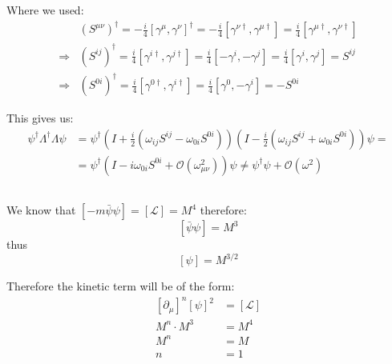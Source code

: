 \documentclass[11pt]{article}
\begin{document}
Where we used:
\begin{equation}
\begin{split}
    &(S^{\mu\nu})^\dagger = 
    -\frac{i}{4}[\gamma^\mu,\gamma^\nu]^\dagger=
    -\frac{i}{4}[\gamma^{\nu\dagger},\gamma^{\mu\dagger}]=
    \frac{i}{4}[\gamma^{\mu\dagger},\gamma^{\nu\dagger}]\\
    \Rightarrow & (S^{ij})^\dagger = 
    \frac{i}{4}[\gamma^{i\dagger},\gamma^{j\dagger}]=
    \frac{i}{4}[-\gamma^i,-\gamma^j]=
    \frac{i}{4}[\gamma^i,\gamma^j] = 
    S^{ij}\\
    \Rightarrow & (S^{0i})^\dagger = 
    \frac{i}{4}[\gamma^{0\dagger},\gamma^{i\dagger}]=
    \frac{i}{4}[\gamma^0,-\gamma^i]=
    -S^{0i}
\end{split}
\end{equation}

This gives us:
\begin{equation}
\begin{split}
    \psi^\dagger\Lambda^\dagger\Lambda\psi &= 
    \psi^\dagger \left( I + \frac{i}{2}(\omega_{ij}S^{ij}-\omega_{0i}S^{0i}) \right) \left(I - \frac{i}{2}(\omega_{ij}S^{ij} + \omega_{0i}S^{0i}) \right) \psi=\\
    &=\psi^\dagger\left(I - i\omega_{0i}S^{0i} +\mathcal O(\omega_{\mu \nu}^2) \right)\psi  \neq \psi^\dagger\psi + \mathcal O(\omega^2)
\end{split}
\end{equation}

\subsection{}
We know that $[-m\bar\psi \psi]=[\mathcal L]=M^4$ therefore: $$ [\bar\psi \psi ] = M^3$$ thus \begin{equation}
    \boxed{[\psi]=M^{3/2}}
\end{equation}

Therefore the kinetic term will be of the form:
\begin{equation}
\begin{split}
    [\partial_\mu]^n[\psi]^2 &= [\mathcal L]\\
    M^n\cdot M^3 &= M^4\\
    M^n &= M\\
    n&=1
\end{split}
\end{equation}

\subsection{}
\end{document}
